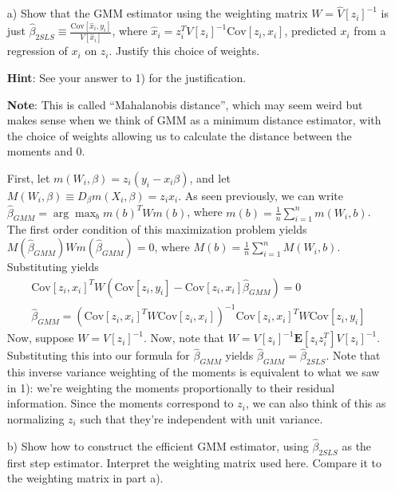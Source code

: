 \documentclass[12pt,english]{article}
\begin{document}
\begin{enumerate}
	\item[a)] Show that the GMM estimator using the weighting matrix $W = \hat{V}[z_{i}]^{-1}$ is just $\hat{\beta}_{2SLS} \equiv \frac{\text{Cov}[\hat{x}_{i}, y_{i}]}{V[\hat{x}_{i}]}$, where $\hat{x}_{i} = z_{i}^{T} V[z_{i}]^{-1} \text{Cov}[z_{i}, x_{i}]$, predicted $x_{i}$ from a regression of $x_{i}$ on $z_{i}$. Justify this choice of weights.
	
	\textbf{Hint}: See your answer to 1) for the justification.
	
	\textbf{Note}: This is called ``Mahalanobis distance'', which may seem weird but makes sense when we think of GMM as a minimum distance estimator, with the choice of weights allowing us to calculate the distance between the moments and 0.
	\vspace{1em}
	
	First, let $m(W_{i}, \beta) = z_{i}(y_{i} - x_{i} \beta)$, and let $M(W_{i}, \beta) \equiv D_{\beta} m(X_{i}, \beta) = z_{i} x_{i}$. As seen previously, we can write $\hat{\beta}_{GMM} = \arg \max_{b} m(b)^{T} W m(b)$, where $m(b) = \frac{1}{n} \sum_{i=1}^{n} m(W_{i}, b)$. The first order condition of this maximization problem yields $M(\hat{\beta}_{GMM}) W m(\hat{\beta}_{GMM}) = 0$, where $M(b) = \frac{1}{n} \sum_{i=1}^{n} M(W_{i}, b)$. Substituting yields
	\begin{align*}
	\text{Cov}[z_{i}, x_{i}]^{T} W \left( \text{Cov}[z_{i}, y_{i}] - \text{Cov}[z_{i}, x_{i}] \hat{\beta}_{GMM} \right) = 0 \\
	\hat{\beta}_{GMM} = \left( \text{Cov}[z_{i}, x_{i}]^{T} W \text{Cov}[z_{i}, x_{i}] \right)^{-1} \text{Cov}[z_{i}, x_{i}]^{T} W \text{Cov}[z_{i}, y_{i}]
	\end{align*}
	Now, suppose $W = V[z_{i}]^{-1}$. Now, note that $W = V[z_{i}]^{-1} \mathbf{E}[z_{i} z_{i}^{T}] V[z_{i}]^{-1}$. Substituting this into our formula for $\hat{\beta}_{GMM}$ yields $\hat{\beta}_{GMM} = \hat{\beta}_{2SLS}$. Note that this inverse variance weighting of the moments is equivalent to what we saw in 1): we're weighting the moments proportionally to their residual information. Since the moments correspond to $z_{i}$, we can also think of this as normalizing $z_{i}$ such that they're independent with unit variance.
	\vspace{1em}	
	\item[b)] Show how to construct the efficient GMM estimator, using $\hat{\beta}_{2SLS}$ as the first step estimator. Interpret the weighting matrix used here. Compare it to the weighting matrix in part a).
	\vspace{1em}
	

\end{enumerate}
\end{document}
